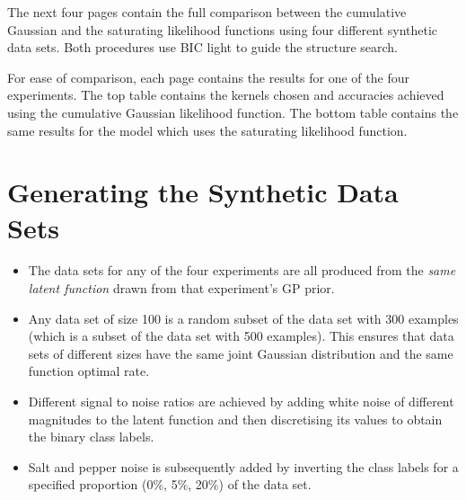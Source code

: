 
The next four pages contain the full comparison between the cumulative Gaussian and the saturating likelihood functions using four different synthetic data sets. Both procedures use BIC light to guide the structure search. 

For ease of comparison, each page contains the results for one of the four experiments. The top table contains the kernels chosen and accuracies achieved using the cumulative Gaussian likelihood function. The bottom table contains the same results for the model which uses the saturating likelihood function. 

\section*{Generating the Synthetic Data Sets}

\begin{itemize}

\item The data sets for any of the four experiments are all produced from the \emph{same latent function} drawn from that experiment's {GP} prior. 

\item Any data set of size 100 is a random subset of the data set with 300 examples (which is a subset of the data set with 500 examples). This ensures that data sets of different sizes have the same joint Gaussian distribution and the same function optimal rate.

\item Different signal to noise ratios are achieved by adding white noise of different magnitudes to the latent function and then discretising its values to obtain the binary class labels. 

\item Salt and pepper noise is subsequently added by inverting the class labels for a specified proportion (0\%, 5\%, 20\%) of the data set. 

\end{itemize}

\clearpage


